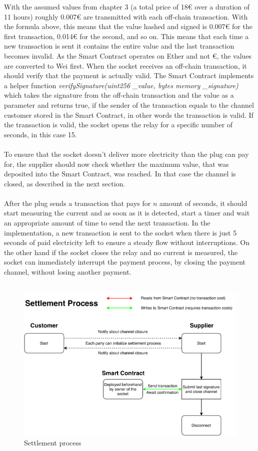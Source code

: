 With the assumed values from chapter 3 (a total price of 18\euro{} over a duration of 11 hours) roughly 0.007\euro{} are transmitted with each off-chain transaction. With the formula above, this means that the value hashed and signed is 0.007\euro{} for the first transaction, 0.014\euro{} for the second, and so on. This means that each time a new transaction is sent it contains the entire value and the last transaction becomes invalid. As the Smart Contract operates on Ether and not \euro, the values are converted to Wei first. When the socket receives an off-chain transaction, it should verify that the payment is actually valid. The Smart Contract implements a helper function \textit{verifySignature(uint256 \_value, bytes memory \_signature)} which takes the signature from the off-chain transaction and the value as a parameter and returns true, if the sender of the transaction equals to the channel customer stored in the Smart Contract, in other words the transaction is valid. If the transaction is valid, the socket opens the relay for a specific number of seconds, in this case 15.
\\\\
To ensure that the socket doesn’t deliver more electricity than the plug can pay for, the supplier should now check whether the maximum value, that was deposited into the Smart Contract, was reached. In that case the channel is closed, as described in the next section.
\\\\
After the plug sends a transaction that pays for $n$ amount of seconds, it should start measuring the current and as soon as it is detected, start a timer and wait an appropriate amount of time to send the next transaction. In the implementation, a new transaction is sent to the socket when there is just 5 seconds of paid electricity left to ensure a steady flow without interruptions. On the other hand if the socket closes the relay and no current is measured, the socket can immediately interrupt the payment process, by closing the payment channel, without losing another payment. 
\\\\
\begin{figure}[H]
    \includegraphics[width=\textwidth]{img/Plug-Socket-settlement_process.pdf}
    \caption{Settlement process}
    \label{fig:settlement_process}
\end{figure}
